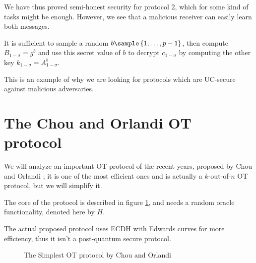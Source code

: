 We have thus proved semi-honest security for protocol 2, which for some kind of tasks might be enough. However, we see that a malicious receiver can easily learn both messages.

It is sufficient to sample a random $b\sample\set{1,\dots,p-1}$, then compute $B_{1-\sigma}=g^b$ and use this secret value of $b$ to decrypt $c_{1-\sigma}$ by computing the other key $k_{1-\sigma}=A_{1-\sigma}^b$.

This is an example of why we are looking for protocols which are UC-secure against malicious adversaries.


\section{The Chou and Orlandi OT protocol}
We will analyze an important OT protocol of the recent years, proposed by Chou and Orlandi \cite{Chou_Orlandi}; it is one of the most efficient ones and is actually a $k$-out-of-$n$ OT protocol, but we will simplify it.

The core of the protocol is described in figure \ref{prot_CO}, and needs a random oracle functionality, denoted here by $H$.

The actual proposed protocol uses ECDH with Edwards curves for more efficiency, thus it isn't a post-quantum secure protocol.

\begin{figure}
    \caption{The Simplest OT protocol by Chou and Orlandi}
    \label{prot_CO}
\end{figure}

